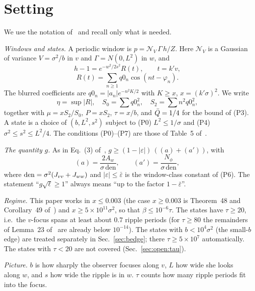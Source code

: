 \section{Setting}
\label{sec:setting}

We use the notation of~\cite{F} and recall only what is needed.

\emph{Windows and states.}
A periodic window is $p=\mathcal N_V\,\Gamma\,h/Z$.
Here $\mathcal N_V$ is a Gaussian of variance $V=\sigma^2/b$ in $v$ and $\Gamma=N(0,L^2)$ in $w$, and
\begin{equation}
h-1=e^{-w^2/2s^2}R(t),\qquad t=k'v,
\end{equation}
\begin{equation}
R(t)=\sum_{n\ge1}q0_n\cos(nt-\varphi_n).
\end{equation}
The blurred coefficients are $q0_n=|a_n|e^{-n^2K/2}$ with $K\ge x$, $x=(k'\sigma)^2$.
We write
\begin{equation}
\eta=\sup|R|,\quad S_0=\sum q0_n^2,\quad S_2=\sum n^2q0_n^2,
\end{equation}
together with $\mu=xS_2/S_0$, $P=xS_2$, $\tau=x/b$, and $\bar Q=1/4$ for the bound of (P3).
A state is a choice of $(b,L^2,s^2)$ subject to (P0) $L^2\le1/\sigma$ and (P4) $\sigma^2\le s^2\le L^2/4$.
The conditions (P0)--(P7) are those of Table~5 of~\cite{F}.

\emph{The quantity $g$.}
As in Eq.~(3) of~\cite{F}, $g\ge(1-|\varepsilon|)\,((a)+(a'))$, with
\begin{equation}
(a)=\frac{2A_w}{\sigma\,\mathrm{den}},\qquad (a')=\frac{N_\phi}{\sigma\,\mathrm{den}},
\end{equation}
where $\mathrm{den}=\sigma^2(J_{vv}+J_{ww})$ and $|\varepsilon|\le\bar\varepsilon$ is the window-class constant of (P6).
The statement ``$g\sqrt\ell\ge1$'' always means ``up to the factor $1-\bar\varepsilon$''.

\emph{Regime.}
This paper works in $x\le0.003$ (the case $x\ge0.003$ is Theorem~48 and Corollary~49 of~\cite{F}) and $x\ge5\times10^{11}\sigma^2$, so that $\beta\le10^{-6}\tau$.
The states have $\tau\ge20$, i.e.\ the $v$-focus spans at least about $0.7$ ripple periods (for $\tau\ge80$ the remainders of Lemma~23 of~\cite{F} are already below $10^{-14}$).
The states with $b<10^4\sigma^2$ (the small-$b$ edge) are treated separately in Sec.~\ref{sec:bedge}; there $\tau\ge5\times10^7$ automatically.
The states with $\tau<20$ are not covered (Sec.~\ref{sec:open:tau}).

\emph{Picture.} $b$ is how sharply the observer focuses along $v$, $L$ how wide she looks along $w$, and $s$ how wide the ripple is in $w$.
$\tau$ counts how many ripple periods fit into the focus.
